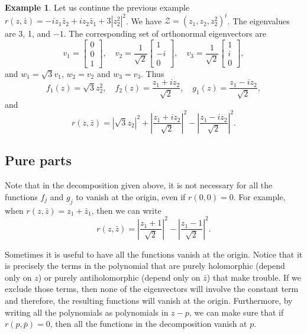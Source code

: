 \documentclass[12pt,openany]{book}
\newcommand{\abs}[1]{\left\lvert {#1} \right\rvert}
\newcommand{\sZ}{{\mathcal{Z}}}
\theoremstyle{plain}
\theoremstyle{remark}
\theoremstyle{definition}
\theoremstyle{exercise}
\theoremstyle{example}
\newtheorem{example}[thm]{Example}
\begin{document}
\begin{example}
Let us continue the previous example
$r(z,\bar{z}) = - i z_1 \bar{z}_2 + i z_2 \bar{z}_1 + 3 \abs{z_2^2}^2$.
We have $\sZ = {(z_1,z_2,z_2^2)}^t$.
The eigenvalues are 3, 1, and $-1$.  The corresponding
set of orthonormal eigenvectors are
\begin{equation}
v_1 =
\begin{bmatrix}
0 \\ 0 \\ 1
\end{bmatrix}
,
\quad
v_2 =
\frac{1}{\sqrt{2}}
\begin{bmatrix}
1 \\ -i \\ 0
\end{bmatrix}
,
\quad
v_3 =
\frac{1}{\sqrt{2}}
\begin{bmatrix}
1 \\ i \\ 0
\end{bmatrix}
,
\end{equation}
and $w_1 = \sqrt{3} v_1$, $w_2 = v_2$ and $w_3 = v_3$.  Thus
\begin{equation}
f_1(z) = \sqrt{3} z_2^2, \quad
f_2(z) = \frac{z_1+iz_2}{\sqrt{2}}, \quad
g_1(z) = \frac{z_1-iz_2}{\sqrt{2}} ,
\end{equation}
and
\begin{equation}
r(z,\bar{z})
=
\abs{\sqrt{3} z_2}^2 +
\abs{\frac{z_1+iz_2}{\sqrt{2}}}^2
-
\abs{\frac{z_1-iz_2}{\sqrt{2}}}^2.
\end{equation}
\end{example}

\subsection{Pure parts}

Note that in the decomposition given above, it is not necessary for all
the functions $f_j$ and $g_j$ to vanish at the origin, even if $r(0,0) = 0$.
For example, when $r(z,\bar{z}) = z_1 + \bar{z}_1$, then we can write
\begin{equation}
r(z,\bar{z}) =
\abs{\frac{z_1 + 1}{\sqrt{2}}}^2 - 
\abs{\frac{z_1 - 1}{\sqrt{2}}}^2 .
\end{equation}

Sometimes it is useful to have all the functions vanish at the origin.
Notice that it is precisely the terms in the polynomial that are purely
holomorphic (depend only on $z$) or purely antiholomorphic (depend only on
$\bar{z}$) that make trouble.  If we exclude those terms, then none of the
eigenvectors will involve the constant term and therefore, the
resulting functions will vanish at the origin.
Furthermore, by writing all the polynomials as polynomials in $z-p$,
we can make sure that if $r(p, \bar{p}) = 0$,
then all the functions in the decomposition vanish at $p$.
\end{document}
